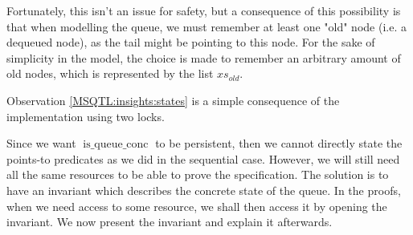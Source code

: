 \documentclass[twoside,11pt,openright]{report}
\newcommand{\isqueueconc}{\operatorname{is\_queue\_conc}}
\begin{document}
Fortunately, this isn't an issue for safety, but a consequence of this possibility is that when modelling the queue, we must remember at least one "old" node (i.e. a dequeued node), as the tail might be pointing to this node. For the sake of simplicity in the model, the choice is made to remember an arbitrary amount of old nodes, which is represented by the list $xs_{old}$.

Observation \ref{MSQTL:insights:states} is a simple consequence of the implementation using two locks.

Since we want $\isqueueconc$ to be persistent, then we cannot directly state the points-to predicates as we did in the sequential case. However, we will still need all the same resources to be able to prove the specification. The solution is to have an invariant which describes the concrete state of the queue. In the proofs, when we need access to some resource, we shall then access it by opening the invariant. We now present the invariant and explain it afterwards.
\end{document}
